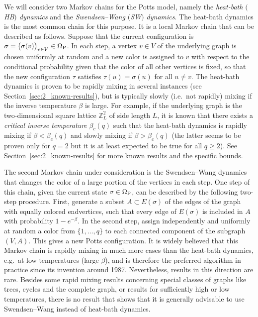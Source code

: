\documentclass{dis}
\theoremstyle{citing}
\begin{document}
We will consider two Markov chains for the Potts model, 
namely the \emph{heat-bath $($HB\/$)$ dynamics} and the 
\emph{Swendsen--Wang $($SW\/$)$ dynamics}. 
The heat-bath dynamics is the most common chain for 
this purpose. It is a local Markov chain that can be 
described as follows. Suppose that the current configuration 
is $\sigma=\bigl(\sigma(v)\bigr)_{v\in V}\in{{\Omega}_{\rm P}}$. 
In each step, a vertex $v\in V$ of the underlying 
graph is chosen uniformly at random and a new color 
is assigned to $v$ with respect to the conditional 
probability given that the color of all other vertices is fixed, 
so that the new configuration $\tau$ satisfies 
$\tau(u)=\sigma(u)$ for all $u\neq v$. 
The heat-bath dynamics is proven to be rapidly mixing in 
several instances (see Section~\ref{sec:2_known-results}), 
but is typically slowly (i.e.~not rapidly) mixing 
if the inverse temperature $\beta$ is large. 
For example, if the underlying graph is the two-dimensional 
square lattice ${\ensuremath{\mathbb{Z}}}_L^2$ of side length $L$, it is known that 
there exists a \emph{critical inverse temperature} $\beta_c(q)$ 
such that the heat-bath dynamics is rapidly mixing if 
$\beta<\beta_c(q)$ and slowly mixing if $\beta>\beta_c(q)$ 
(the latter seems to be proven only for $q=2$ but it is at least 
expected to be true for all $q\ge2$). 
See Section~\ref{sec:2_known-results} for more known 
results and the specific bounds.

The second Markov chain under consideration is the 
Swendsen--Wang dynamics that changes the color of a large portion 
of the vertices in each step. 
One step of this chain, given the current state $\sigma\in{{\Omega}_{\rm P}}$, 
can be described by the following two-step procedure. 
First, generate a subset $A\subset E(\sigma)$ of the edges of 
the graph with equally colored endvertices, 
such that every edge of $E(\sigma)$ 
is included in $A$ with probability $1-e^{-\beta}$. 
In the second step, assign independently and uniformly at random 
a color from $\{1,\dots,q\}$ to each connected component 
of the subgraph $(V,A)$. This gives a new Potts configuration. 
It is widely believed that this Markov chain is rapidly mixing 
in much more cases than the heat-bath dynamics, 
e.g.~at low temperatures (large $\beta$), 
and is therefore the preferred algorithm in practice 
since its invention around 1987.
Nevertheless, results in this direction are rare. 
Besides some rapid mixing results concerning special classes of 
graphs like trees, cycles and the complete graph, 
or results for sufficiently high or low temperatures, 
there is no result that shows that it is generally advisable 
to use Swendsen--Wang instead of heat-bath dynamics.
\end{document}
